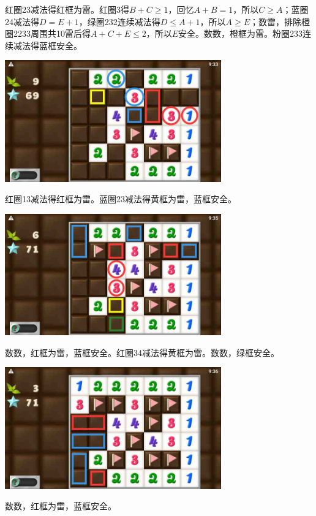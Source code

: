 红圈23减法得红框为雷。红圈3得$B+C\ge 1$，回忆$A+B=1$，所以$C\ge A$；蓝圈24减法得$D=E+1$，绿圈232连续减法得$D\le A+1$，所以$A\ge E$；数雷，排除橙圈2233周围共10雷后得$A+C+E\le 2$，所以$E$安全。数数，橙框为雷。粉圈233连续减法得蓝框安全。
\begin{center}
    \includegraphics[width=0.7\textwidth]{puzzlelow/247-4.jpg}
\end{center}
红圈13减法得红框为雷。蓝圈23减法得黄框为雷，蓝框安全。
\begin{center}
    \includegraphics[width=0.7\textwidth]{puzzlelow/247-5.jpg}
\end{center}
数数，红框为雷，蓝框安全。红圈34减法得黄框为雷。数数，绿框安全。
\begin{center}
    \includegraphics[width=0.7\textwidth]{puzzlelow/247-6.jpg}
\end{center}
数数，红框为雷，蓝框安全。

